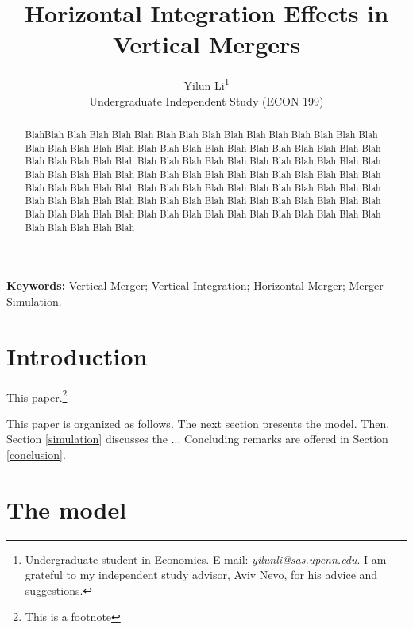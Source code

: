 \documentclass[12pt]{article}%
\begin{document}
\title{Horizontal Integration Effects in Vertical Mergers}
\author{Yilun Li\thanks{Undergraduate student in Economics. E-mail:
\textit{yilunli@sas.upenn.edu}. I am grateful to my independent study advisor, Aviv Nevo, for his advice
and suggestions.}\medskip\\{\normalsize Undergraduate Independent Study (ECON 199)}}
\maketitle

\sloppy%

\onehalfspacing

\begin{abstract}
BlahBlah Blah Blah Blah Blah Blah Blah Blah Blah Blah Blah Blah Blah Blah Blah Blah Blah Blah Blah Blah Blah Blah Blah Blah Blah Blah Blah Blah Blah Blah Blah Blah Blah Blah Blah Blah Blah Blah Blah Blah Blah Blah Blah Blah Blah Blah Blah Blah Blah Blah Blah Blah Blah Blah Blah Blah Blah Blah Blah Blah Blah Blah Blah Blah Blah Blah Blah Blah Blah Blah Blah Blah Blah Blah Blah Blah Blah Blah Blah Blah Blah Blah Blah Blah Blah Blah Blah Blah Blah Blah Blah Blah Blah Blah Blah Blah Blah Blah Blah Blah Blah Blah Blah Blah Blah Blah Blah Blah Blah Blah Blah Blah Blah Blah Blah Blah 
\end{abstract}

\strut

\textbf{Keywords:} Vertical Merger; Vertical Integration; Horizontal Merger; Merger Simulation.

\strut


\pagebreak%
\doublespacing %


\section{Introduction}
\label{intro} %

This paper.\footnote{This is a footnote}

This paper is organized as follows. The next section presents the model. Then, Section \ref{simulation} discusses the ... Concluding remarks are offered in Section \ref{conclusion}.

\section{The model}
\label{model}
\end{document}
